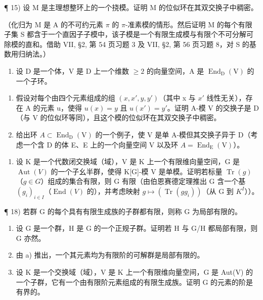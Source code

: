 ¶ 15) 设 M 是主理想整环上的一个挠模。证明 M 的位似环在其双交换子中稠密。

（化归为 M 是 A 的不可约元素 \(\pi\) 的 \(\pi\)-准素模的情形。然后证明 M 的每个有限子集 S 都含于一个直因子子模中，该子模是一个有限生成模与有限个不可分解可除模的直和。借助 VII, §2, 第 54 页习题 3 及 VII, §2, 第 56 页习题 8，对 S 的基数用归纳法。）

\begin{enumerate}
\def\labelenumi{\arabic{enumi})}
\setcounter{enumi}{15}
\tightlist
\item
  设 D 是一个体，V 是 D 上一个维数 \(\geqslant 2\) 的向量空间，A 是 \(\operatorname{End}_{\mathrm{D}}(\mathrm{V})\) 的一个子环。
\end{enumerate}

\begin{enumerate}
\def\labelenumi{\alph{enumi})}
\item
  假设对每个由四个元素组成的组 \((x, x', y, y')\)（其中 x 与 \(x'\) 线性无关），存在 A 的元素 u，使得 \(u(x) = y\) 且 \(u(x') = y'\)。证明 A-模 V 的交换子是 D（与 V 的位似环等同），且这个模的位似环在其双交换子中稠密。
\item
  给出环 \(A \subset \operatorname{End}_{\mathrm{D}}(\mathrm{V})\) 的一个例子，使 V 是单 A-模但其交换子异于 D（考虑一个含 D 的体 E、E 上的一个向量空间 V 以及环 \(A = \operatorname{End}_{\mathrm{E}}(\mathrm{V})\)）。
\end{enumerate}

\begin{enumerate}
\def\labelenumi{\arabic{enumi})}
\setcounter{enumi}{16}
\tightlist
\item
  设 K 是一个代数闭交换域（域），V 是 K 上一个有限维向量空间，G 是 \(\operatorname{Aut}(V)\) 的一个子幺半群，使得 K{[}G{]}-模 V 是单模。证明若标量 \(\operatorname{Tr}(g)\)（\(g \in G\)）组成的集合有限，则 G 有限（由伯恩赛德定理推出 G 含一个基 \((g_{i})_{i \in I}\)（\(\operatorname{End}(V)\) 的），并考虑映射 \(g \mapsto (\operatorname{Tr}(gg_{i}))\)（从 G 到 \(K^{I}\)））。
\end{enumerate}

¶ 18) 若群 G 的每个具有有限生成族的子群都有限，则称 G 为局部有限的。

\begin{enumerate}
\def\labelenumi{\alph{enumi})}
\item
  设 G 是一个群，H 是 G 的一个正规子群。证明若 H 与 G/H 都局部有限，则 G 亦然。
\item
  由 a) 推出，一个其元素均为有限阶的可解群是局部有限的。
\item
  设 K 是一个交换域（域），V 是 K 上一个有限维向量空间，G 是 Aut(V) 的一个子群，它有一个由有限阶元素组成的有限生成族。证明 G 的元素的阶是有界的。
\end{enumerate}

